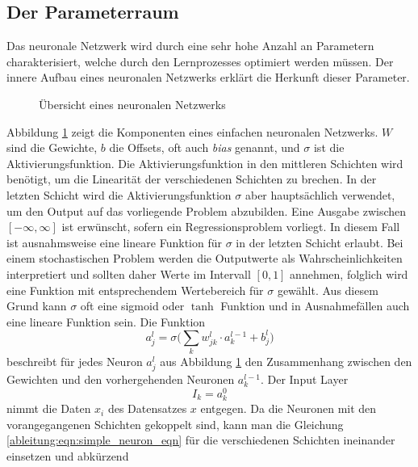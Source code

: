 \subsection{Der Parameterraum}
Das neuronale Netzwerk wird durch eine sehr hohe Anzahl an Parametern
charakterisiert, welche durch den Lernprozesses optimiert werden
müssen.
Der innere Aufbau eines neuronalen Netzwerks erklärt die Herkunft
dieser Parameter.
\begin{figure}
	\begin{center}
		
		\caption{Übersicht eines neuronalen Netzwerks}
		\label{ableitung:fig:neuronal_network}
	\end{center}
\end{figure} 
Abbildung \ref{ableitung:fig:neuronal_network} zeigt die Komponenten eines einfachen neuronalen Netzwerks.
$W$ sind die Gewichte, $b$ die Offsets, oft auch {\em bias} genannt, und $\sigma$ ist die Aktivierungsfunktion.
%
%
%
Die Aktivierungsfunktion in den mittleren Schichten wird benötigt, um die Linearität der verschiedenen Schichten zu brechen.
%
In der letzten Schicht wird die Aktivierungsfunktion $\sigma$ aber hauptsächlich verwendet, um den Output auf das vorliegende Problem abzubilden.
Eine Ausgabe zwischen $[-\infty, \infty]$ ist erwünscht, sofern ein Regressionsproblem vorliegt.
In diesem Fall ist ausnahmsweise eine lineare Funktion für $\sigma$
in der letzten Schicht erlaubt.
Bei einem stochastischen Problem werden die Outputwerte als
Wahrscheinlichkeiten interpretiert und sollten daher Werte im Intervall
$[0,1]$ annehmen, folglich wird eine Funktion mit entsprechendem
Wertebereich für $\sigma$ gewählt.
Aus diesem Grund kann $\sigma$ oft eine  sigmoid oder $\tanh$
Funktion und in Ausnahmefällen auch eine lineare Funktion sein.
Die Funktion
\begin{equation}
a^{l}_{j} = \sigma \biggl( \sum\limits_{k}w^{l}_{jk} \cdot a^{l-1}_{k}+b^{l}_{j} \biggr)
\label{ableitung:eqn:simple_neuron_eqn}
\end{equation}
beschreibt für jedes Neuron $a^{l}_{j}$ aus Abbildung
\ref{ableitung:fig:neuronal_network} den Zusammenhang zwischen den
Gewichten und den vorhergehenden Neuronen $a^{l-1}_{k}$.
%
Der Input Layer 
\begin{equation}
I_k = a_{k}^{0}
\end{equation}
nimmt die Daten $x_i$ des Datensatzes $x$ entgegen.
Da die Neuronen mit den vorangegangenen Schichten gekoppelt sind, kann man die Gleichung \eqref{ableitung:eqn:simple_neuron_eqn} für die verschiedenen Schichten ineinander einsetzen und abkürzend
